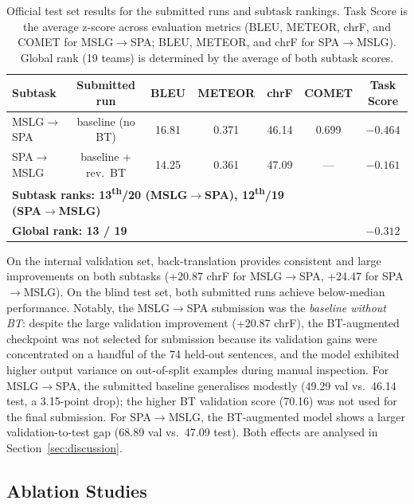 \documentclass[sigconf,screen]{ceurart}
\begin{document}
\begin{table}[h]
\centering
\caption{Official test set results for the submitted runs and subtask
  rankings. Task Score is the average z-score across evaluation metrics
  (BLEU, METEOR, chrF, and COMET for MSLG$\to$SPA; BLEU, METEOR, and
  chrF for SPA$\to$MSLG). Global rank (19 teams) is determined by the
  average of both subtask scores.}
\label{tab:testresults}
\begin{tabular}{lcccccc}
\toprule
\textbf{Subtask} & \textbf{Submitted run} & \textbf{BLEU} & \textbf{METEOR} & \textbf{chrF} & \textbf{COMET} & \textbf{Task Score} \\
\midrule
MSLG$\!\to\!$SPA & baseline (no BT) & 16.81 & 0.371 & 46.14 & 0.699 & $-0.464$ \\
SPA$\!\to\!$MSLG & baseline + rev.\ BT & 14.25 & 0.361 & 47.09 & --- & $-0.161$ \\
\midrule
\multicolumn{5}{l}{\textbf{Subtask ranks: 13\textsuperscript{th}/20 (MSLG$\to$SPA), 12\textsuperscript{th}/19 (SPA$\to$MSLG)}} & & \\
\multicolumn{5}{l}{\textbf{Global rank: 13 / 19}} & & $-0.312$ \\
\bottomrule
\end{tabular}
\end{table}

On the internal validation set, back-translation provides consistent
and large improvements on both subtasks
(+20.87 chrF for MSLG$\!\to\!$SPA, +24.47 for SPA$\!\to\!$MSLG).
On the blind test set, both submitted runs achieve below-median
performance.
Notably, the MSLG$\!\to\!$SPA submission was the \emph{baseline without
BT}: despite the large validation improvement (+20.87 chrF), the
BT-augmented checkpoint was not selected for submission because its
validation gains were concentrated on a handful of the 74 held-out
sentences, and the model exhibited higher output variance on out-of-split
examples during manual inspection.
For MSLG$\!\to\!$SPA, the submitted baseline generalises modestly
(49.29 val vs.\ 46.14 test, a 3.15-point drop); the higher BT
validation score (70.16) was not used for the final submission.
For SPA$\!\to\!$MSLG, the BT-augmented model shows a larger
validation-to-test gap (68.89 val vs.\ 47.09 test).
Both effects are analysed in Section~\ref{sec:discussion}.

\subsection{Ablation Studies}
\label{sec:ablation}
\end{document}
